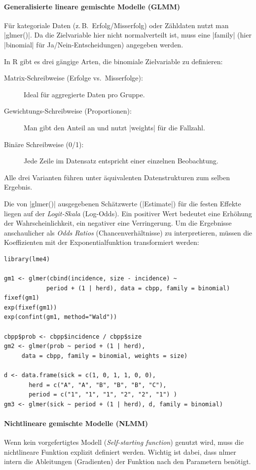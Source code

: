 \documentclass[10pt,twocolumn]{scrartcl}
\renewcommand{\lstinline}{\mycoloredinline}
\begin{document}
\paragraph{Generalisierte lineare gemischte Modelle (GLMM)}
Für kategoriale Daten (z.\,B.\ Erfolg/Misserfolg) oder Zähldaten nutzt man \lstinline|glmer()|. Da die Zielvariable hier nicht normalverteilt ist, muss eine \lstinline|family| (hier \lstinline|binomial| für Ja/Nein-Entscheidungen) angegeben werden.

In R gibt es drei gängige Arten, die binomiale Zielvariable zu definieren:
\begin{description}
\item[Matrix-Schreibweise (Erfolge vs.\ Misserfolge):] Ideal für aggregierte Daten pro Gruppe.
\item[Gewichtungs-Schreibweise (Proportionen):] Man gibt den Anteil an und nutzt \lstinline|weights| für die Fallzahl.
\item[Binäre Schreibweise (0/1):] Jede Zeile im Datensatz entspricht einer einzelnen Beobachtung.
\end{description}

Alle drei Varianten führen unter äquivalenten Datenstrukturen zum selben Ergebnis.

Die von \lstinline|glmer()| ausgegebenen Schätzwerte (\lstinline|Estimate|) für die festen Effekte liegen auf der \emph{Logit-Skala} (Log-Odds). Ein positiver Wert bedeutet eine Erhöhung der Wahrscheinlichkeit, ein negativer eine Verringerung. Um die Ergebnisse anschaulicher als \emph{Odds Ratios} (Chancenverhältnisse) zu interpretieren, müssen die Koeffizienten mit der Exponentialfunktion transformiert werden:

\begin{lstlisting}
library(lme4)

gm1 <- glmer(cbind(incidence, size - incidence) ~
            period + (1 | herd), data = cbpp, family = binomial)
fixef(gm1)
exp(fixef(gm1))
exp(confint(gm1, method="Wald"))

cbpp$prob <- cbpp$incidence / cbpp$size
gm2 <- glmer(prob ~ period + (1 | herd),
     data = cbpp, family = binomial, weights = size)

d <- data.frame(sick = c(1, 0, 1, 1, 0, 0),
       herd = c("A", "A", "B", "B", "B", "C"),
       period = c("1", "1", "1", "2", "2", "1") )
gm3 <- glmer(sick ~ period + (1 | herd), d, family = binomial)
\end{lstlisting}


\paragraph{Nichtlineare gemischte Modelle (NLMM)}
Wenn kein vorgefertigtes Modell (\textit{Self-starting function}) genutzt wird, muss die nichtlineare Funktion explizit definiert werden. Wichtig ist dabei, dass nlmer intern die Ableitungen (Gradienten) der Funktion nach den Parametern benötigt.
\end{document}
